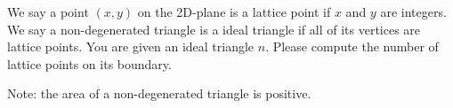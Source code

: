 We say a point $(x,y)$ on the 2D-plane is a lattice point if $x$ and $y$ are integers.
We say a non-degenerated triangle is a ideal triangle if all of its vertices are lattice points.
You are given an ideal triangle $n$. Please compute the number of lattice points on its boundary.

Note: the area of a non-degenerated triangle is positive.
